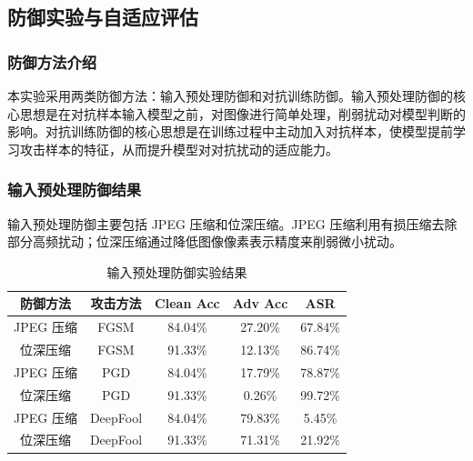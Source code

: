 \documentclass[UTF8,a4paper,12pt]{ctexart}
\begin{document}
\subsection{防御实验与自适应评估}

\subsubsection{防御方法介绍}

本实验采用两类防御方法：输入预处理防御和对抗训练防御。输入预处理防御的核心思想是在对抗样本输入模型之前，对图像进行简单处理，削弱扰动对模型判断的影响。对抗训练防御的核心思想是在训练过程中主动加入对抗样本，使模型提前学习攻击样本的特征，从而提升模型对对抗扰动的适应能力。

\begin{table}[H]
    \centering
    \caption{防御方法概述}
    \label{tab:defense_methods}
\end{table}

\subsubsection{输入预处理防御结果}

输入预处理防御主要包括 JPEG 压缩和位深压缩。JPEG 压缩利用有损压缩去除部分高频扰动；位深压缩通过降低图像像素表示精度来削弱微小扰动。

\begin{table}[H]
    \centering
    \caption{输入预处理防御实验结果}
    \begin{tabular}{ccccc}
        \toprule
        防御方法 & 攻击方法 & Clean Acc & Adv Acc & ASR \\
        \midrule
        JPEG 压缩 & FGSM & 84.04\% & 27.20\% & 67.84\% \\
        位深压缩 & FGSM & 91.33\% & 12.13\% & 86.74\% \\
        JPEG 压缩 & PGD & 84.04\% & 17.79\% & 78.87\% \\
        位深压缩 & PGD & 91.33\% & 0.26\% & 99.72\% \\
        JPEG 压缩 & DeepFool & 84.04\% & 79.83\% & 5.45\% \\
        位深压缩 & DeepFool & 91.33\% & 71.31\% & 21.92\% \\
        \bottomrule
    \end{tabular}
    \label{tab:preprocess_defense}
\end{table}
\end{document}
